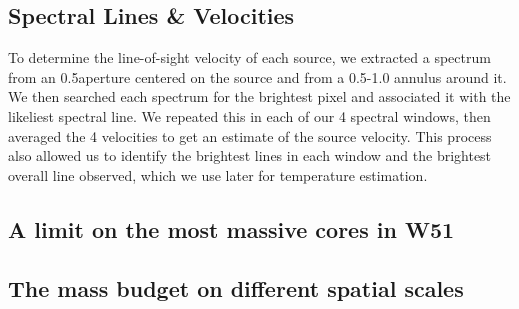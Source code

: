 \subsection{Spectral Lines \& Velocities}
To determine the line-of-sight velocity of each source, we extracted a spectrum
from an 0.5\arcsec aperture centered on the source and from a 0.5-1.0\arcsec
annulus around it.  We then searched each spectrum for the brightest pixel and
associated it with the likeliest spectral line.  We repeated this in each of
our 4 spectral windows, then averaged the 4 velocities to get an estimate of
the source velocity.   This process also allowed us to identify the brightest
lines in each window and the brightest overall line observed, which we use
later for temperature estimation.

\subsection{A limit on the most massive cores in W51}


\subsection{The mass budget on different spatial scales}
